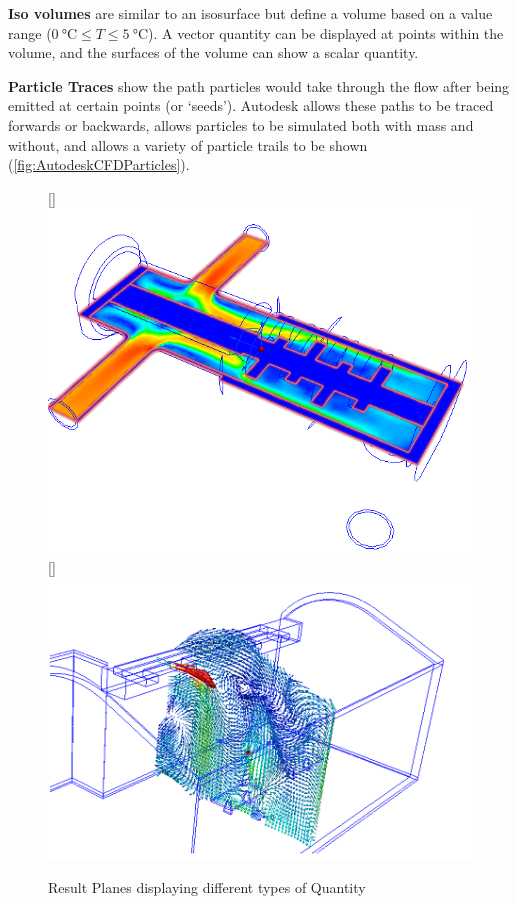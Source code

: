 \textbf{Iso volumes} are similar to an isosurface but define a volume based on a value range ($\SI{0}{\celsius} \leq T \leq \SI{5}{\celsius}$).
A vector quantity can be displayed at points within the volume, and the surfaces of the volume can show a scalar quantity.

\textbf{Particle Traces} show the path particles would take through the flow after being emitted at certain points (or `seeds').
Autodesk allows these paths to be traced forwards or backwards, allows particles to be simulated both with mass and without, and allows a variety of particle trails to be shown (\cref{fig:AutodeskCFDParticles}).

\begin{figure}
    \centering
    [\linewidth]{\includegraphics[width=0.9\linewidth]{Ch20Research/figures/autodesk_cfd_results_planes_scalar.png}}
    [\linewidth]{\includegraphics[width=0.9\linewidth]{Ch20Research/figures/autodesk_cfd_results_planes_vector.png}}
    \caption{Result Planes displaying different types of Quantity}
    \label{fig:AutodeskCFDResultsPlane}
\end{figure}

